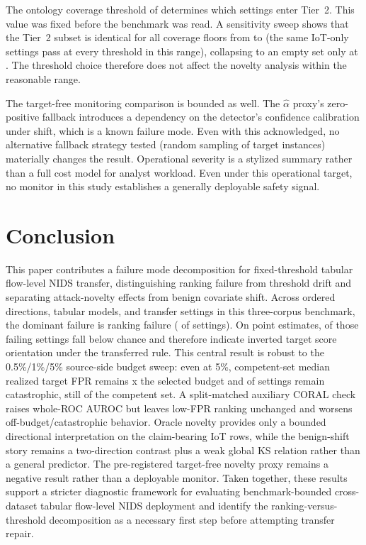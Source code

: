 \documentclass[preprint,12pt]{elsarticle}
\begin{document}


The ontology coverage threshold of \NoveltyCoverageFloor{} determines which settings enter Tier~2. This value was fixed before the benchmark was read. A sensitivity sweep shows that the Tier~2 subset is identical for all coverage floors from \CoverageSweepStableFloorMin{} to \CoverageSweepStableFloorMax{} (the same \PrimaryIotSettingCount{} IoT-only settings pass at every threshold in this range), collapsing to an empty set only at \CoverageSweepEmptyFloor{}. The threshold choice therefore does not affect the novelty analysis within the reasonable range.

The target-free monitoring comparison is bounded as well. The $\hat{\alpha}$ proxy's zero-positive fallback introduces a dependency on the detector's confidence calibration under shift, which is a known failure mode. Even with this acknowledged, no alternative fallback strategy tested (random sampling of target instances) materially changes the result. Operational severity is a stylized summary rather than a full cost model for analyst workload. Even under this operational target, no monitor in this study establishes a generally deployable safety signal.

\section{Conclusion}

This paper contributes a failure mode decomposition for fixed-threshold tabular flow-level NIDS transfer, distinguishing ranking failure from threshold drift and separating attack-novelty effects from benign covariate shift. Across \DirectionCount{} ordered directions, \ModelCount{} tabular models, and \NaturalSettingCount{} transfer settings in this three-corpus benchmark, the dominant failure is ranking failure (\FullRankingFailureCount{} of \NaturalSettingCount{} settings). On point estimates, \FullInversionCount{} of those failing settings fall below chance and therefore indicate inverted target score orientation under the transferred rule. This central result is robust to the 0.5\%/1\%/5\% source-side budget sweep: even at 5\%, competent-set median realized target FPR remains \BudgetFivePctCompetentMedianBudgetMultiple{}x the selected budget and \BudgetFivePctCompetentCatastrophicCount{} of \CompetentSettingCount{} settings remain catastrophic, still \BudgetFivePctCompetentCatastrophicShare{} of the competent set. A split-matched auxiliary CORAL check raises whole-ROC AUROC but leaves low-FPR ranking unchanged and worsens off-budget/catastrophic behavior. Oracle novelty provides only a bounded directional interpretation on the \PrimaryIotSettingCount{} claim-bearing IoT rows, while the benign-shift story remains a two-direction contrast plus a weak global KS relation rather than a general predictor. The pre-registered target-free novelty proxy remains a negative result rather than a deployable monitor. Taken together, these results support a stricter diagnostic framework for evaluating benchmark-bounded cross-dataset tabular flow-level NIDS deployment and identify the ranking-versus-threshold decomposition as a necessary first step before attempting transfer repair.
\end{document}
